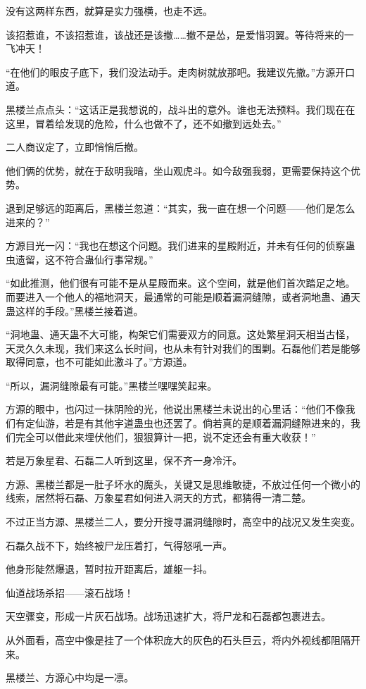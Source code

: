 \begin{this_body}
没有这两样东西，就算是实力强横，也走不远。

该招惹谁，不该招惹谁，该战还是该撤……撤不是怂，是爱惜羽翼。等待将来的一飞冲天！

“在他们的眼皮子底下，我们没法动手。走肉树就放那吧。我建议先撤。”方源开口道。

黑楼兰点点头：“这话正是我想说的，战斗出的意外。谁也无法预料。我们现在在这里，冒着给发现的危险，什么也做不了，还不如撤到远处去。”

二人商议定了，立即悄悄后撤。

他们俩的优势，就在于敌明我暗，坐山观虎斗。如今敌强我弱，更需要保持这个优势。

退到足够远的距离后，黑楼兰忽道：“其实，我一直在想一个问题——他们是怎么进来的？”

方源目光一闪：“我也在想这个问题。我们进来的星殿附近，并未有任何的侦察蛊虫遗留，这不符合蛊仙行事常规。”

“如此推测，他们很有可能不是从星殿而来。这个空间，就是他们首次踏足之地。而要进入一个他人的福地洞天，最通常的可能是顺着漏洞缝隙，或者洞地蛊、通天蛊这样的手段。”黑楼兰接着道。

“洞地蛊、通天蛊不大可能，构架它们需要双方的同意。这处繁星洞天相当古怪，天灵久久未现，我们来这么长时间，也从未有针对我们的围剿。石磊他们若是能够取得同意，也不可能如此激斗了。”方源道。

“所以，漏洞缝隙最有可能。”黑楼兰嘿嘿笑起来。

方源的眼中，也闪过一抹阴险的光，他说出黑楼兰未说出的心里话：“他们不像我们有定仙游，若是有其他宇道蛊虫也还罢了。倘若真的是顺着漏洞缝隙进来的，我们完全可以借此来埋伏他们，狠狠算计一把，说不定还会有重大收获！”

若是万象星君、石磊二人听到这里，保不齐一身冷汗。

方源、黑楼兰都是一肚子坏水的魔头，关键又是思维敏捷，不放过任何一个微小的线索，居然将石磊、万象星君如何进入洞天的方式，都猜得一清二楚。

不过正当方源、黑楼兰二人，要分开搜寻漏洞缝隙时，高空中的战况又发生突变。

石磊久战不下，始终被尸龙压着打，气得怒吼一声。

他身形陡然爆退，暂时拉开距离后，雄躯一抖。

仙道战场杀招——滚石战场！

天空骤变，形成一片灰石战场。战场迅速扩大，将尸龙和石磊都包裹进去。

从外面看，高空中像是挂了一个体积庞大的灰色的石头巨云，将内外视线都阻隔开来。

黑楼兰、方源心中均是一凛。


\end{this_body}
